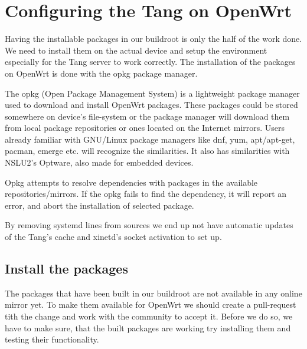 \chapter{Configuring the Tang on OpenWrt}\label{config}

Having the installable packages in our buildroot is only the half of the work done.
We need to install them on the actual device and setup the environment especially for the Tang server to work correctly.
The installation of the packages on OpenWrt is done with the opkg package manager.

The opkg (Open Package Management System) is a lightweight package manager used to download and install OpenWrt packages.
These packages could be stored somewhere on device's file-system or the package manager will download them from local package repositories or ones located on the Internet mirrors.
Users already familiar with GNU/Linux package managers like dnf, yum, apt/apt-get, pacman, emerge etc. will recognize the similarities.
It also has similarities with NSLU2's Optware, also made for embedded devices.

Opkg attempts to resolve dependencies with packages in the available repositories/mirrors.
If the opkg fails to find the dependency, it will report an error, and abort the installation of selected package.

By removing systemd lines from sources we end up not have automatic updates of the Tang's cache and xinetd's socket activation to set up.



\section{Install the packages}

The packages that have been built in our buildroot are not available in any online mirror yet.
To make them available for OpenWrt we should create a pull-request tith the change and work with the community to accept it.
Before we do so, we have to make sure, that the built packages are working try installing them and testing their functionality.

